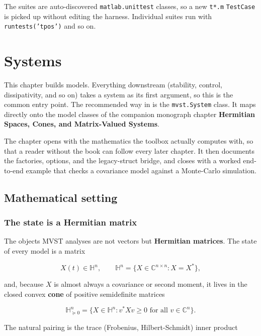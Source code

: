 \documentclass[11pt,oneside]{report}
\newcommand{\code}[1]{\texttt{#1}}
\begin{document}
The suites are auto-discovered \code{matlab.unittest} classes, so a new \code{t*.m}
\code{TestCase} is picked up without editing the harness. Individual suites run with
\code{runtests('tpos')} and so on.


\hypertarget{chap:02-systems}{%
\chapter{Systems}\label{chap:02-systems}}

This chapter builds models. Everything downstream (stability, control,
dissipativity, and so on) takes a system as its first argument, so this is the
common entry point. The recommended way in is the \code{mvst.System} class. It maps
directly onto the model classes of the companion monograph chapter \textbf{Hermitian
Spaces, Cones, and Matrix-Valued Systems}.

The chapter opens with the mathematics the toolbox actually computes with, so
that a reader without the book can follow every later chapter. It then documents
the factories, options, and the legacy-struct bridge, and closes with a worked
end-to-end example that checks a covariance model against a Monte-Carlo
simulation.

\hypertarget{mathematical-setting}{%
\section{Mathematical setting}\label{mathematical-setting}}

\hypertarget{the-state-is-a-hermitian-matrix}{%
\subsection{The state is a Hermitian matrix}\label{the-state-is-a-hermitian-matrix}}

The objects MVST analyses are not vectors but \textbf{Hermitian matrices}. The state
of every model is a matrix

\[X(t)\in\mathbb{H}^{n},\qquad \mathbb{H}^{n}=\{X\in\mathbb{C}^{n\times n}:X=X^{*}\},\]

and, because \(X\) is almost always a covariance or second moment, it lives in the
closed convex \textbf{cone} of positive semidefinite matrices

\[\mathbb{H}^{n}_{\succeq 0}=\{X\in\mathbb{H}^{n}:v^{*}Xv\ge 0 \text{ for all } v\in\mathbb{C}^{n}\}.\]

The natural pairing is the trace (Frobenius, Hilbert-Schmidt) inner product
\end{document}
